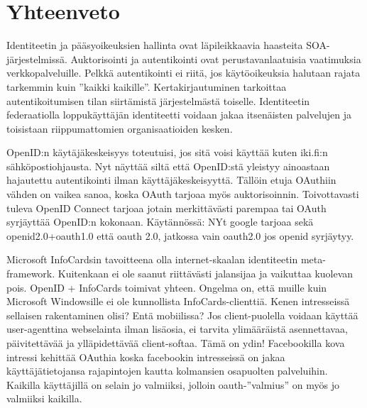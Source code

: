 \documentclass[finnish,gradu]{tktltiki}
\begin{document}


\section{Yhteenveto} %
\label{sec:yhteenveto}

  Identiteetin ja pääsyoikeuksien hallinta ovat läpileikkaavia haasteita SOA-järjestelmissä.
  Auktorisointi ja autentikointi ovat perustavanlaatuisia vaatimuksia verkkopalveluille. Pelkkä autentikointi ei riitä, jos käytöoikeuksia halutaan rajata tarkemmin kuin ''kaikki kaikille''. Kertakirjautuminen tarkoittaa autentikoitumisen tilan siirtämistä järjestelmästä toiselle. Identiteetin federaatiolla loppukäyttäjän identiteetti voidaan jakaa itsenäisten palvelujen ja toisistaan riippumattomien organisaatioiden kesken.

    OpenID:n käytäjäkeskeisyys toteutuisi, jos sitä voisi käyttää kuten iki.fi:n sähköpostiohjausta. Nyt näyttää siltä että OpenID:stä yleistyy ainoastaan hajautettu autentikointi ilman käyttäjäkeskeisyyttä. Tällöin etuja OAuthiin vähden on vaikea sanoa, koska OAuth tarjoaa myös auktorisoinnin. Toivottavasti tuleva OpenID Connect tarjoaa jotain merkittävästi parempaa tai OAuth syrjäyttää OpenID:n kokonaan. Käytännössä: NYt google tarjoaa sekä openid2.0+oauth1.0 että oauth 2.0, jatkossa vain oauth2.0 jos openid syrjäytyy.

 Microsoft InfoCardsin tavoitteena olla internet-skaalan identiteetin meta-framework. Kuitenkaan ei ole saanut riittävästi jalansijaa ja vaikuttaa kuolevan pois. OpenID + InfoCards toimivat yhteen. Ongelma on, että muille kuin Microsoft Windowsille ei ole kunnollista InfoCards-clienttiä. Kenen intresseissä sellaisen rakentaminen olisi? Entä mobiilissa? Jos client-puolella voidaan käyttää user-agenttina webselainta ilman lisäosia, ei tarvita ylimääräistä asennettavaa, päivitettävää ja ylläpidettävää client-softaa. Tämä on ydin! Facebookilla kova intressi kehittää OAuthia koska facebookin intresseissä on jakaa käyttäjätietojansa rajapintojen kautta kolmansien osapuolten palveluihin. Kaikilla käyttäjillä on selain jo valmiiksi, jolloin oauth-''valmius'' on myös jo valmiiksi kaikilla.







\lastpage
\end{document}
